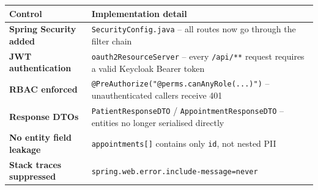 \documentclass[12pt,a4paper]{report}
\begin{document}
\par\noindent\begin{minipage}{\linewidth}
\centering
\scriptsize
\renewcommand{\arraystretch}{0.88}
\begin{tabularx}{\linewidth}{>{\bfseries}p{4.2cm} X}
\toprule
\textbf{Control} & \textbf{Implementation detail} \\
\midrule
Spring Security added    & \texttt{SecurityConfig.java} -- all routes now go through the filter chain \\
JWT authentication       & \texttt{oauth2ResourceServer} -- every \texttt{/api/**} request requires a valid Keycloak Bearer token \\
RBAC enforced            & \texttt{@PreAuthorize("@perms.canAnyRole(...)")} -- unauthenticated callers receive 401 \\
Response DTOs            & \texttt{PatientResponseDTO} / \texttt{AppointmentResponseDTO} -- entities no longer serialised directly \\
No entity field leakage  & \texttt{appointments[]} contains only \texttt{id}, not nested PII \\
Stack traces suppressed  & \texttt{spring.web.error.include-message=never} \\
\bottomrule
\end{tabularx}
\end{minipage}
\par\medskip
\end{document}
